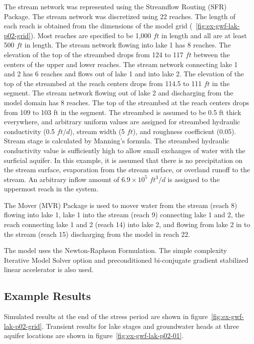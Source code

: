 The stream network was represented using the Streamflow Routing (SFR) Package. The stream network was discretized using 22 reaches. The length of each reach is obtained from the dimensions of the model grid (~\ref{fig:ex-gwf-lak-p02-grid}). Most reaches are specified to be 1,000 $ft$ in length and all are at least 500 $ft$ in length. The stream network flowing into lake 1 has 8 reaches. The elevation of the top of the streambed drops from 124 to 117 $ft$ between the centers of the upper and lower reaches. The stream network connecting lake 1 and 2 has 6 reaches and flows out of lake 1 and into lake 2. The elevation of the top of the streambed at the reach centers drops from 114.5 to 111 $ft$ in the segment. The stream network flowing out of lake 2 and discharging from the model domain has 8 reaches. The top of the streambed at the reach centers drops from 109 to 103 ft in the segment. The streambed is assumed to be 0.5 ft thick everywhere, and arbitrary uniform values are assigned for streambed hydraulic conductivity (0.5 $ft/d$), stream width (5 $ft$), and roughness coefficient (0.05). Stream stage is calculated by Manning’s formula. The streambed hydraulic conductivity value is sufficiently high to allow small exchanges of water with the surficial aquifer. In this example, it is assumed that there is no precipitation on the stream surface, evaporation from the stream surface, or overland runoff to the stream. An arbitrary inflow amount of $6.9 \times 10^5$ $ft^{3}/d$ is assigned to the uppermost reach in the system.

The Mover (MVR) Package is used to mover water from the stream (reach 8) flowing into lake 1, lake 1 into the stream (reach 9) connecting lake 1 and 2, the reach connecting lake 1 and 2 (reach 14) into lake 2, and flowing from lake 2 in to the stream (reach 15) discharging from the model in reach 22.

The model uses the Newton-Raphson Formulation. The simple complexity Iterative Model Solver option and preconditioned bi-conjugate gradient stabilized linear accelerator is also used.

\subsection{Example Results}

Simulated results at the end of the stress period are shown in figure~\ref{fig:ex-gwf-lak-p02-grid}. Transient results for lake stages and groundwater heads at three aquifer locations are shown in figure~\ref{fig:ex-gwf-lak-p02-01}. 

